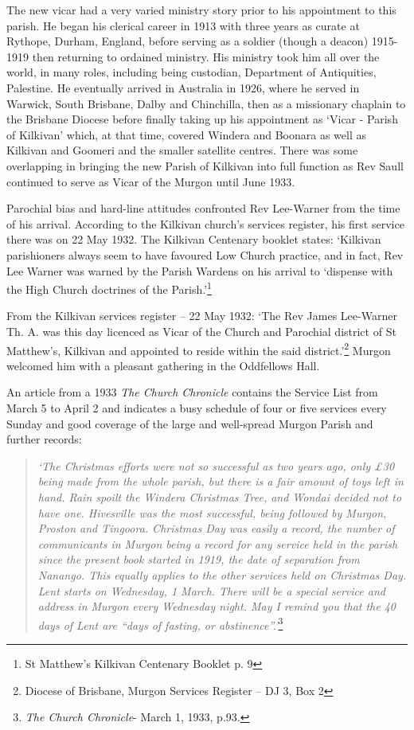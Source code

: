 The new vicar had a very varied ministry story prior to his appointment
to this parish. He began his clerical career in 1913 with three years as
curate at Rythope, Durham, England, before serving as a soldier (though
a deacon) 1915-1919 then returning to ordained ministry. His ministry
took him all over the world, in many roles, including being custodian,
Department of Antiquities, Palestine. He eventually arrived in Australia
in 1926, where he served in Warwick, South Brisbane, Dalby and
Chinchilla, then as a missionary chaplain to the Brisbane Diocese before
finally taking up his appointment as `Vicar - Parish of Kilkivan' which,
at that time, covered Windera and Boonara as well as Kilkivan and
Goomeri and the smaller satellite centres. There was some overlapping in
bringing the new Parish of Kilkivan into full function as Rev Saull
continued to serve as Vicar of the Murgon until June 1933.

Parochial bias and hard-line attitudes confronted Rev Lee-Warner from
the time of his arrival. According to the Kilkivan church's services
register, his first service there was on 22 May 1932. The Kilkivan
Centenary booklet states: `Kilkivan parishioners always seem to have
favoured Low Church practice, and in fact, Rev Lee Warner was warned by
the Parish Wardens on his arrival to `dispense with the High Church
doctrines of the Parish.'\footnote{St Matthew's Kilkivan Centenary
  Booklet p. 9}

From the Kilkivan services register -- 22 May 1932: `The Rev James
Lee-Warner Th. A. was this day licenced as Vicar of the Church and
Parochial district of St Matthew's, Kilkivan and appointed to reside
within the said district.'\footnote{Diocese of Brisbane, Murgon Services
  Register -- DJ 3, Box 2} Murgon welcomed him with a pleasant gathering
in the Oddfellows Hall.

An article from a 1933 \emph{The Church Chronicle} contains the Service
List from March 5 to April 2 and indicates a busy schedule of four or
five services every Sunday and good coverage of the large and
well-spread Murgon Parish and further records:

\begin{quote}
\emph{`The Christmas efforts were not so successful as two years ago,
only \pounds30 being made from the whole parish, but there is a fair amount of
toys left in hand. Rain spoilt the Windera Christmas Tree, and Wondai
decided not to have one. Hivesville was the most successful, being
followed by Murgon, Proston and Tingoora. Christmas Day was easily a
record, the number of communicants in Murgon being a record for any
service held in the parish since the present book started in 1919, the
date of separation from Nanango. This equally applies to the other
services held on Christmas Day. Lent starts on Wednesday, 1 March. There
will be a special service and address in Murgon every Wednesday night.
May I remind you that the 40 days of Lent are ``days of fasting, or
abstinence''.'}\footnote{\emph{The Church Chronicle}- March 1, 1933,
  p.93.}
\end{quote}

